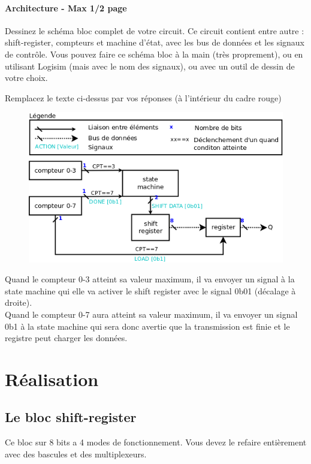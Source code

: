 \documentclass[a4paper]{article} %
\begin{document}
\begin{tcolorbox}[colframe=Monokaimagenta,colback=white]
\paragraph{Architecture - Max 1/2 page}
Dessinez le schéma bloc complet de votre circuit. Ce circuit contient entre autre : shift-register, compteurs et machine d’état, avec les bus de données et les signaux de contrôle. Vous pouvez faire ce schéma bloc à la main (très proprement), ou en utilisant Logisim (mais avec le nom des signaux), ou avec un outil de dessin de votre choix.

Remplacez le texte ci-dessus par vos réponses (à l’intérieur du cadre rouge)\\

\begin{figure}[H]
    \centering
    \includegraphics[width=.8\textwidth]{src/schema_bloc.png}
    \label{fig:schem_bloc}
\end{figure}

Quand le compteur 0-3 atteint sa valeur maximum, il va envoyer un signal à la state machine qui elle va activer le shift register avec le signal 0b01 (décalage à droite).\\
Quand le compteur 0-7 aura atteint sa valeur maximum, il va envoyer un signal 0b1 à la state machine qui sera donc avertie que la transmission est finie et le registre peut charger les données.

\end{tcolorbox}

\section {Réalisation}
\subsection{Le bloc shift-register}
Ce bloc sur 8 bits a 4 modes de fonctionnement. Vous devez le refaire entièrement avec des bascules et des multiplexeurs.
\end{document}
